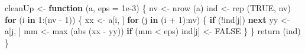 \documentclass[
  12pt,
]{book}
\newenvironment{Shaded}{\begin{snugshade}}{\end{snugshade}}
\newcommand{\AttributeTok}[1]{\textcolor[rgb]{0.77,0.63,0.00}{#1}}
\newcommand{\ConstantTok}[1]{\textcolor[rgb]{0.00,0.00,0.00}{#1}}
\newcommand{\ControlFlowTok}[1]{\textcolor[rgb]{0.13,0.29,0.53}{\textbf{#1}}}
\newcommand{\DecValTok}[1]{\textcolor[rgb]{0.00,0.00,0.81}{#1}}
\newcommand{\FloatTok}[1]{\textcolor[rgb]{0.00,0.00,0.81}{#1}}
\newcommand{\FunctionTok}[1]{\textcolor[rgb]{0.00,0.00,0.00}{#1}}
\newcommand{\NormalTok}[1]{#1}
\newcommand{\OtherTok}[1]{\textcolor[rgb]{0.56,0.35,0.01}{#1}}
\newcommand{\SpecialCharTok}[1]{\textcolor[rgb]{0.00,0.00,0.00}{#1}}
\theoremstyle{definition}
\theoremstyle{definition}
\theoremstyle{definition}
\theoremstyle{definition}
\theoremstyle{remark}
\begin{document}
\begin{Shaded}
\begin{Highlighting}[]
\NormalTok{cleanUp }\OtherTok{\textless{}{-}} \ControlFlowTok{function}\NormalTok{ (a, }\AttributeTok{eps =} \FloatTok{1e{-}3}\NormalTok{) \{}
\NormalTok{  nv }\OtherTok{\textless{}{-}} \FunctionTok{nrow}\NormalTok{ (a)}
\NormalTok{  ind }\OtherTok{\textless{}{-}} \FunctionTok{rep}\NormalTok{ (}\ConstantTok{TRUE}\NormalTok{, nv)}
  \ControlFlowTok{for}\NormalTok{ (i }\ControlFlowTok{in} \DecValTok{1}\SpecialCharTok{:}\NormalTok{(nv }\SpecialCharTok{{-}} \DecValTok{1}\NormalTok{)) \{}
\NormalTok{    xx }\OtherTok{\textless{}{-}}\NormalTok{ a[i, ]}
    \ControlFlowTok{for}\NormalTok{ (j }\ControlFlowTok{in}\NormalTok{ (i }\SpecialCharTok{+} \DecValTok{1}\NormalTok{)}\SpecialCharTok{:}\NormalTok{nv) \{}
      \ControlFlowTok{if}\NormalTok{ (}\SpecialCharTok{!}\NormalTok{ind[j])}
        \ControlFlowTok{next}
\NormalTok{      yy }\OtherTok{\textless{}{-}}\NormalTok{ a[j, ]}
\NormalTok{      mm }\OtherTok{\textless{}{-}} \FunctionTok{max}\NormalTok{ (}\FunctionTok{abs}\NormalTok{ (xx }\SpecialCharTok{{-}}\NormalTok{ yy))}
      \ControlFlowTok{if}\NormalTok{ (mm }\SpecialCharTok{\textless{}}\NormalTok{ eps)}
\NormalTok{        ind[j] }\OtherTok{\textless{}{-}} \ConstantTok{FALSE}
\NormalTok{    \}}
\NormalTok{  \}}
  \FunctionTok{return}\NormalTok{ (ind)}
\NormalTok{\}}


\end{Highlighting}
\end{Shaded}
\end{document}
